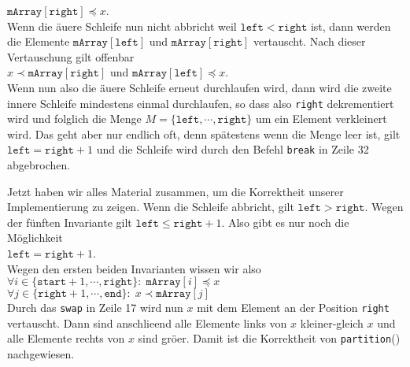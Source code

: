 \begin{enumerate}
      \hspace*{1.3cm} $\mathtt{mArray}[\mathtt{right}] \preceq x$. \\[0.2cm]
      Wenn die \"au\3ere Schleife nun nicht abbricht weil $\texttt{left} < \mathtt{right}$ ist,
      dann werden die Elemente $\mathtt{mArray}[\mathtt{left}]$ und
      $\mathtt{mArray}[\mathtt{right}]$ vertauscht.  Nach dieser Vertauschung gilt 
      offenbar \\[0.2cm]
      \hspace*{1.3cm} 
      $x \prec \mathtt{mArray}[\mathtt{right}]$ \quad und \quad $\mathtt{mArray}[\mathtt{left}] \preceq x$. 
      \\[0.2cm]
      Wenn nun also die \"au\3ere Schleife erneut durchlaufen wird, dann wird die zweite
      innere Schleife mindestens einmal durchlaufen, so dass also \texttt{right}
      dekrementiert wird und folglich die Menge $M = \{ \mathtt{left}, \cdots, \mathtt{right} \}$ 
      um ein Element verkleinert wird.  Das geht aber nur endlich oft, denn sp\"atestens
      wenn die Menge leer ist, gilt $\mathtt{left} = \mathtt{right} + 1$
      und die Schleife wird durch den Befehl \texttt{break} in Zeile 32 abgebrochen. 
\end{enumerate}
Jetzt haben wir alles Material zusammen, um die Korrektheit unserer Implementierung zu zeigen.
Wenn die Schleife abbricht, gilt $\mathtt{left} > \mathtt{right}$.  Wegen der f\"unften
Invariante gilt $\texttt{left} \leq \mathtt{right} + 1$.  Also gibt es nur noch die
M\"oglichkeit
\\[0.2cm]
\hspace*{1.3cm}
$\texttt{left} = \mathtt{right} +
1$.
\\[0.2cm]  
Wegen den ersten beiden Invarianten
wissen wir also \\[0.2cm]
\hspace*{1.3cm} 
 $\forall i \in \{ \mathtt{start}+1, \cdots, \mathtt{right} \} \colon\; \mathtt{mArray}[i] \preceq x$ \\[0.2cm]
\hspace*{1.3cm} 
 $\forall j \in \{ \mathtt{right}+1, \cdots, \mathtt{end} \} \colon\; x \prec \mathtt{mArray}[j]$
\\[0.2cm]
Durch das \texttt{swap} in Zeile 17 wird nun $x$ mit dem Element an der Position
\texttt{right} vertauscht.  Dann sind anschlie\3end alle Elemente links von $x$
kleiner-gleich $x$ und alle Elemente rechts von $x$ sind gr\"o\3er.
Damit ist die Korrektheit von \texttt{partition}() nachgewiesen.


